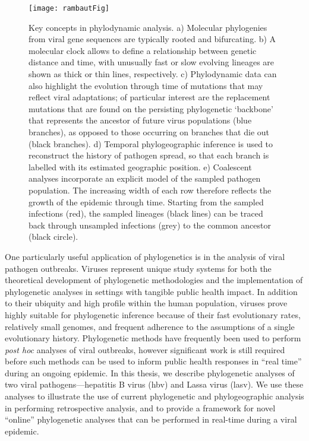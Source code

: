 \begin{figure}[ht]
  \centering
  \medskip
  \texttt{[image: rambautFig]}
  \caption[Applications of phylogenetic analysis]{Key concepts in phylodynamic analysis.
  a) Molecular phylogenies from viral gene sequences are typically rooted and bifurcating.
  b) A molecular clock allows to define a relationship between genetic distance and time, with unusually fast or slow evolving lineages are shown as thick or thin lines, respectively.
  c) Phylodynamic data can also highlight the evolution through time of mutations that may reflect viral adaptations; of particular interest are the replacement mutations that are found on the persisting phylogenetic ‘backbone’ that represents the ancestor of future virus populations (blue branches), as opposed to those occurring on branches that die out (black branches).
  d) Temporal phylogeographic inference is used to reconstruct the history of pathogen spread, so that each branch is labelled with its estimated geographic position.
  e) Coalescent analyses incorporate an explicit model of the sampled pathogen population.
  The increasing width of each row therefore reflects the growth of the epidemic through time. Starting from the sampled infections (red), the sampled lineages (black lines) can be traced back through unsampled infections (grey) to the common ancestor (black circle).
  }
  \label{fig:phylogeneticsOverview}
\end{figure}


One particularly useful application of phylogenetics is in the analysis of viral pathogen outbreaks.
Viruses represent unique study systems for both the theoretical development of phylogenetic methodologies and the implementation of phylogenetic analyses in settings with tangible public health impact.
In addition to their ubiquity and high profile within the human population, viruses prove highly suitable for phylogenetic inference because of their fast evolutionary rates, relatively small genomes, and frequent adherence to the assumptions of a single evolutionary history.
Phylogenetic methods have frequently been used to perform \textit{post hoc} analyses of viral outbreaks, however significant work is still required before such methods can be used to inform public health responses in ``real time'' during an ongoing epidemic.
In this thesis, we describe phylogenetic analyses of two viral pathogens---hepatitis B virus (\gls{hbv}) and Lassa virus (\gls{lasv}).
We use these analyses to illustrate the use of current phylogenetic and phylogeographic analysis in performing retrospective analysis, and to provide a framework for novel ``online'' phylogenetic analyses that can be performed in real-time during a viral epidemic.



